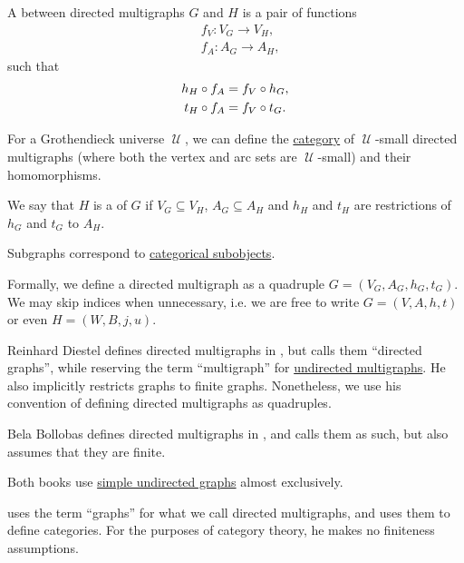 \begin{definition}
\begin{thmenum}[resume=def:directed_multigraph]
     A  between directed multigraphs \( G \) and \( H \) is a pair of functions
    \begin{align*}
      &f_V: V_G \to V_H, \\
      &f_A: A_G \to A_H,
    \end{align*}
    such that
    \begin{subequations}
      \begin{align}
        h_H \bincirc f_A &= f_V \bincirc h_G, \label{eq:def:directed_multigraph/homomorphism/head} \\
        t_H \bincirc f_A &= f_V \bincirc t_G. \label{eq:def:directed_multigraph/homomorphism/tail}
      \end{align}
    \end{subequations}

     For a Grothendieck universe \( \mscrU \), we can define the \hyperref[def:category]{category} of \( \mscrU \)-small directed multigraphs (where both the vertex and arc sets are \( \mscrU \)-small) and their homomorphisms.

     We say that \( H \) is a  of \( G \) if \( V_G \subseteq V_H \), \( A_G \subseteq A_H \) and \( h_H \) and \( t_H \) are restrictions of \( h_G \) and \( t_G \) to \( A_H \).

    Subgraphs correspond to \hyperref[def:subobject_and_quotient]{categorical subobjects}.
  \end{thmenum}
\end{definition}
\begin{comments}
  \item Formally, we define a directed multigraph as a quadruple \( G = (V_G, A_G, h_G, t_G) \). We may skip indices when unnecessary, i.e. we are free to write \( G = (V, A, h, t) \) or even \( H = (W, B, j, u) \).

  \item Reinhard Diestel defines directed multigraphs in \cite[28]{Diestel2005}, but calls them \enquote{directed graphs}, while reserving the term \enquote{multigraph} for \hyperref[def:undirected_multigraph]{undirected multigraphs}. He also implicitly restricts graphs to finite graphs. Nonetheless, we use his convention of defining directed multigraphs as quadruples.

  Bela Bollobas defines directed multigraphs in \cite[8]{Bollobas1998}, and calls them as such, but also assumes that they are finite.

  Both books use \hyperref[def:undirected_graph]{simple undirected graphs} almost exclusively.

   uses the term \enquote{graphs} for what we call directed multigraphs, and uses them to define categories. For the purposes of category theory, he makes no finiteness assumptions.
\end{comments}

